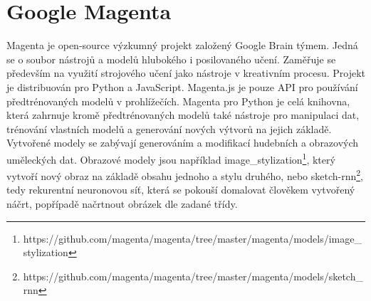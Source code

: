 \section{Google Magenta}
\label{magenta}
Magenta je open-source výzkumný projekt založený Google Brain týmem.
Jedná se o soubor nástrojů a modelů hlubokého i posilovaného učení.
Zaměřuje se především na využití strojového učení jako nástroje
v kreativním procesu.
Projekt je distribuován pro Python a JavaScript.
Magenta.js je pouze API pro používání předtrénovaných modelů v prohlížečích.
Magenta pro Python je celá knihovna, která zahrnuje kromě předtrénovaných modelů
také nástroje pro manipulaci dat, trénování vlastních modelů a generování
nových výtvorů na jejich základě.
\cite{google_magentaHome} 
Vytvořené modely se zabývají generováním a modifikací hudebních 
a obrazových uměleckých dat.
Obrazové modely jsou například image\_stylization\footnote{https://github.com/magenta/magenta/tree/master/magenta/models/image\_stylization},
který vytvoří nový obraz na základě obsahu jednoho a stylu druhého\cite{dumoulin2017learned},
nebo sketch-rnn\footnote{https://github.com/magenta/magenta/tree/master/magenta/models/sketch\_rnn},
tedy rekurentní neuronovou síť, která se pokouší domalovat člověkem vytvořený náčrt,
popřípadě načrtnout obrázek dle zadané třídy\cite{ha2017neural}.
\par

